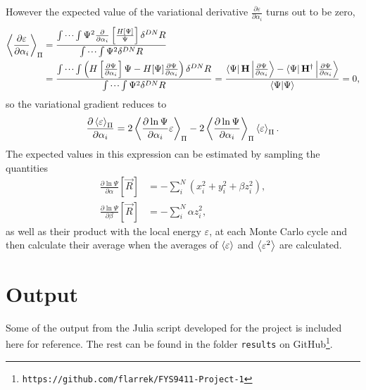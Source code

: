 \documentclass[a4paper,8pt]{article}
\begin{document}
However the expected value of the variational derivative $\frac{\partial\varepsilon}{\partial\alpha_i}$ turns out to be zero,
\begin{align}
\ev{\frac{\partial\varepsilon}{\partial\alpha_i}}_\Pi &= \frac{\idotsint\Psi^2\frac{\partial}{\partial\alpha_i}\left[\frac{H[\Psi]}{\Psi}\right]\delta^{DN}R}{\idotsint \Psi^2 \delta^{DN}R} \nonumber\\
&= \frac{\idotsint\left(H\left[\frac{\partial\Psi}{\partial\alpha_i}\right]\Psi-H[\Psi]\frac{\partial\Psi}{\partial\alpha_i}\right)\delta^{DN}R}{\idotsint \Psi^2 \delta^{DN}R} = \frac{\bra{\Psi}\mathbf{H}\ket{\frac{\partial\Psi}{\partial\alpha_i}}-\bra{\Psi}\mathbf{H}^\dagger\ket{\frac{\partial\Psi}{\partial\alpha_i}}}{\braket{\Psi}{\Psi}} = 0,
\end{align}
so the variational gradient reduces to
\begin{equation}
\frac{\partial\ev{\varepsilon}_\Pi}{\partial\alpha_i} = 2\ev{\frac{\partial\ln\Psi}{\partial\alpha_i}\varepsilon}_\Pi-2\ev{\frac{\partial\ln\Psi}{\partial\alpha_i}}_\Pi\ev{\varepsilon}_\Pi.
\end{equation}
The expected values in this expression can be estimated by sampling the quantities
\begin{align}
\frac{\partial\ln\Psi}{\partial\alpha}[\vec{R}] &= -\sum\limits_i^N \left(x_i^2 + y_i^2 + \beta z_i^2\right), \label{compAlphaGrad}\\
\frac{\partial\ln\Psi}{\partial\beta}[\vec{R}] &= -\sum\limits_i^N \alpha z_i^2, \label{compBetaGrad}
\end{align}
as well as their product with the local energy $\varepsilon$, at each Monte Carlo cycle and then calculate their average when the averages of $\ev{\varepsilon}$ and $\ev{\varepsilon^2}$ are calculated.


\newpage
\section{Output}
Some of the output from the Julia script developed for the project is included here for reference. The rest can be found in the folder \texttt{results} on GitHub\footnote{\texttt{https://github.com/flarrek/FYS9411-Project-1}}.
\end{document}
